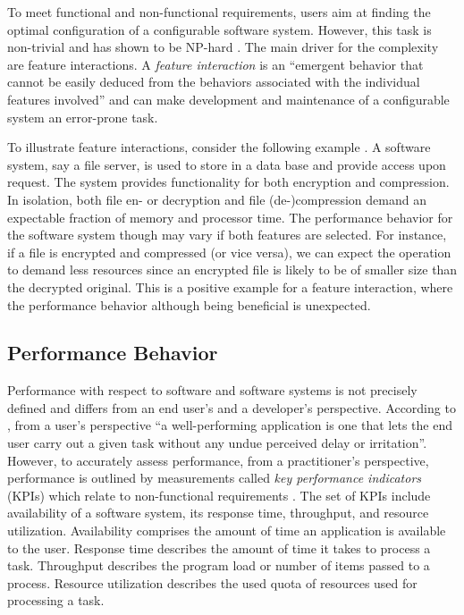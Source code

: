 To meet functional and non-functional requirements, users aim at finding the
optimal configuration of a configurable software system. However, this task is
non-trivial and has shown to be NP-hard \citep{white_selecting_2009}. The main
driver for the complexity are feature interactions. A \emph{feature
interaction} is an ``emergent behavior that cannot be easily deduced from the
behaviors associated with the individual features involved''
\citep{apel_feature-oriented_2013} and can make development and maintenance of
a configurable system an error-prone task.

To illustrate feature interactions, consider the following example
\citep{siegmund_performance-influence_2015}. A software system, say a file
server, is used to store in a data base and provide access upon request. The
system provides functionality for both encryption and compression. In
isolation, both file en- or decryption and file (de-)compression demand an
expectable fraction of memory and processor time. The performance behavior for
the software system though may vary if both features are selected. For
instance, if a file is encrypted and compressed (or vice versa), we can expect
the operation to demand less resources since an encrypted file is likely to be
of smaller size than the decrypted original.
This is a positive example for a feature interaction, where the performance
behavior although being beneficial is unexpected.

\subsection{Performance Behavior}
Performance with respect to software and software systems is not
precisely defined and differs from an end user's and a developer’s perspective.
According to \cite{molyneaux_art_2014}, from a user’s perspective ``a well-performing
application is one that lets the end user carry out a given task without any
undue perceived delay or irritation''. However, to accurately assess
performance, from a practitioner’s perspective, performance is outlined by
measurements called \emph{key performance indicators} (KPIs) which relate to
non-functional requirements \citep{molyneaux_art_2014}. The set of KPIs include
availability of a software system, its response time, throughput, and resource
utilization. Availability comprises the amount of time an application is
available to the user. Response time describes the amount of time it takes to
process a task. Throughput describes the program load or number of items passed
to a process. Resource utilization describes the used quota of resources used
for processing a task.

